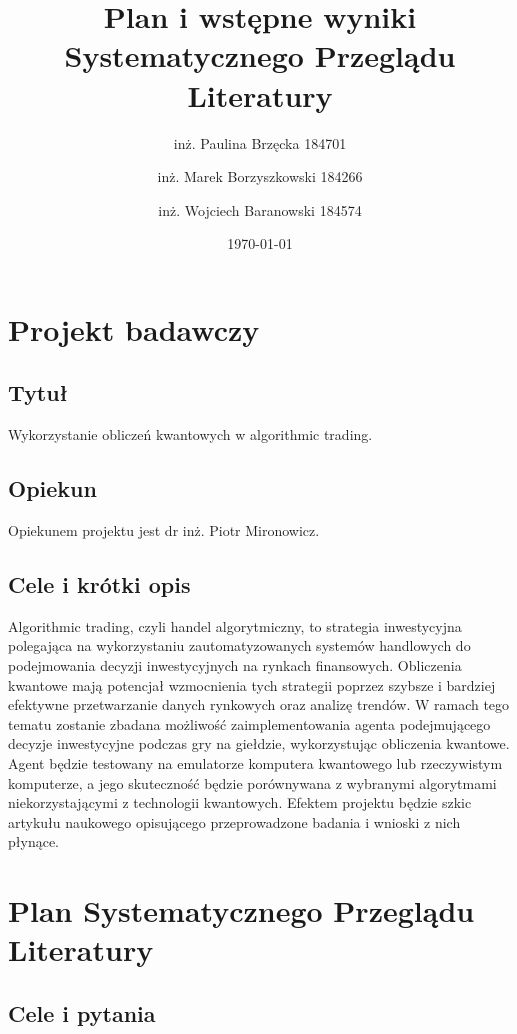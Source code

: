 \documentclass[polish,envcountsect,10pt]{article}
\title{Plan i wstępne wyniki Systematycznego Przeglądu Literatury}
\author{inż. Paulina Brzęcka 184701 \and inż. Marek Borzyszkowski 184266 \and inż. Wojciech Baranowski 184574}
\date{\today}
\begin{document}
\maketitle
\tableofcontents
\newpage

\section{Projekt badawczy}

\subsection{Tytuł}

Wykorzystanie obliczeń kwantowych w algorithmic trading.

\subsection{Opiekun}

Opiekunem projektu jest dr inż. Piotr Mironowicz.

\subsection{Cele i krótki opis}

Algorithmic trading, czyli handel algorytmiczny, to strategia inwestycyjna polegająca na wykorzystaniu zautomatyzowanych systemów handlowych do podejmowania decyzji inwestycyjnych na rynkach finansowych. Obliczenia kwantowe mają potencjał wzmocnienia tych strategii poprzez szybsze i bardziej efektywne przetwarzanie danych rynkowych oraz analizę trendów. W ramach tego tematu zostanie zbadana możliwość zaimplementowania agenta podejmującego decyzje inwestycyjne podczas gry na giełdzie, wykorzystując obliczenia kwantowe. Agent będzie testowany na emulatorze komputera kwantowego lub rzeczywistym komputerze, a jego skuteczność będzie porównywana z wybranymi algorytmami niekorzystającymi z technologii kwantowych. Efektem projektu będzie szkic artykułu naukowego opisującego przeprowadzone badania i wnioski z nich płynące.

\section{Plan Systematycznego Przeglądu Literatury}

\subsection{Cele i pytania}
\end{document}
